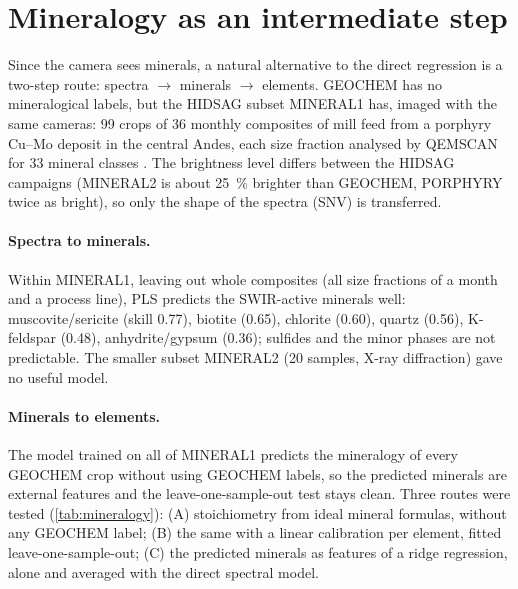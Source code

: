 \documentclass[11pt,a4paper]{article}
\begin{document}
\begin{table}[t]
  \centering\small
  \caption{Robustness checks (LOSO, mean skill over Al \ldots Cu and skill of three elements).}
  \label{tab:robustness}
  
\end{table}

\section{Mineralogy as an intermediate step}\label{sec:mineralogy}

Since the camera sees minerals, a natural alternative to the direct regression is a two-step route: spectra
$\to$ minerals $\to$ elements. GEOCHEM has no mineralogical labels, but the HIDSAG subset MINERAL1 has, imaged
with the same cameras: 99 crops of 36 monthly composites of mill feed from a porphyry Cu--Mo deposit in the central
Andes, each size fraction analysed by QEMSCAN for 33 mineral classes \citep{Ehrenfeld2023}. The brightness level
differs between the HIDSAG campaigns (MINERAL2 is about \SI{25}{\percent} brighter than GEOCHEM, PORPHYRY twice as
bright), so only the shape of the spectra (SNV) is transferred.

\paragraph{Spectra to minerals.} Within MINERAL1, leaving out whole composites (all size fractions of a month and a
process line), PLS predicts the SWIR-active minerals well: muscovite/sericite (skill 0.77), biotite (0.65), chlorite
(0.60), quartz (0.56), K-feldspar (0.48), anhydrite/gypsum (0.36); sulfides and the minor phases are not
predictable. The smaller subset MINERAL2 (20 samples, X-ray diffraction) gave no useful model.

\paragraph{Minerals to elements.} The model trained on all of MINERAL1 predicts the mineralogy of every GEOCHEM
crop without using GEOCHEM labels, so the predicted minerals are external features and the leave-one-sample-out
test stays clean. Three routes were tested (\cref{tab:mineralogy}): (A) stoichiometry from ideal mineral formulas,
without any GEOCHEM label; (B) the same with a linear calibration per element, fitted leave-one-sample-out; (C) the
predicted minerals as features of a ridge regression, alone and averaged with the direct spectral model.
\end{document}
